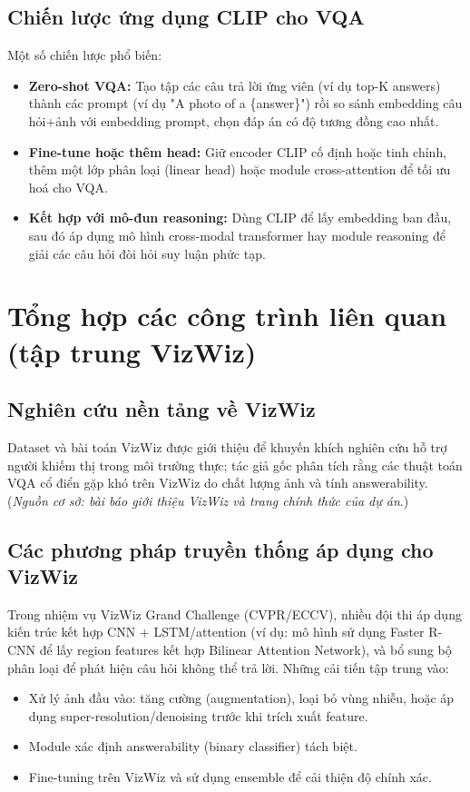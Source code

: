 \subsection{Chiến lược ứng dụng CLIP cho VQA}
Một số chiến lược phổ biến:
\begin{itemize}
    \item \textbf{Zero-shot VQA:} Tạo tập các câu trả lời ứng viên (ví dụ top-K answers) thành các prompt (ví dụ "A photo of a \{answer\}") rồi so sánh embedding câu hỏi+ảnh với embedding prompt, chọn đáp án có độ tương đồng cao nhất.
    \item \textbf{Fine-tune hoặc thêm head:} Giữ encoder CLIP cố định hoặc tinh chỉnh, thêm một lớp phân loại (linear head) hoặc module cross-attention để tối ưu hoá cho VQA.
    \item \textbf{Kết hợp với mô-đun reasoning:} Dùng CLIP để lấy embedding ban đầu, sau đó áp dụng mô hình cross-modal transformer hay module reasoning để giải các câu hỏi đòi hỏi suy luận phức tạp.
\end{itemize}

\section{Tổng hợp các công trình liên quan (tập trung VizWiz)}
\subsection{Nghiên cứu nền tảng về VizWiz}
Dataset và bài toán VizWiz được giới thiệu để khuyến khích nghiên cứu hỗ trợ người khiếm thị trong môi trường thực; tác giả gốc phân tích rằng các thuật toán VQA cổ điển gặp khó trên VizWiz do chất lượng ảnh và tính answerability. (\emph{Nguồn cơ sở: bài báo giới thiệu VizWiz và trang chính thức của dự án}.)\nocite{Gurari2018}

\subsection{Các phương pháp truyền thống áp dụng cho VizWiz}
Trong nhiệm vụ VizWiz Grand Challenge (CVPR/ECCV), nhiều đội thi áp dụng kiến trúc kết hợp CNN + LSTM/attention (ví dụ: mô hình sử dụng Faster R-CNN để lấy region features kết hợp Bilinear Attention Network), và bổ sung bộ phân loại để phát hiện câu hỏi không thể trả lời. Những cải tiến tập trung vào:
\begin{itemize}
    \item Xử lý ảnh đầu vào: tăng cường (augmentation), loại bỏ vùng nhiễu, hoặc áp dụng super-resolution/denoising trước khi trích xuất feature.
    \item Module xác định answerability (binary classifier) tách biệt.
    \item Fine-tuning trên VizWiz và sử dụng ensemble để cải thiện độ chính xác.
\end{itemize}

